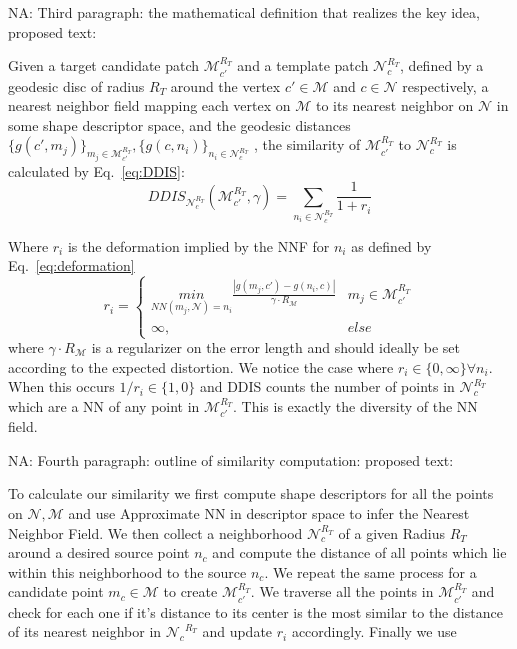 \documentclass[10pt,twocolumn,letterpaper]{article}
\newcommand{\colornote}[3]{{\color{#1}\bf{#2: #3}\normalfont}}
\newcommand{\colornote}[3]{}
\newcommand {\nadav}[1]{\colornote{red}{NA}{#1}}
\begin{document}
\nadav{Third paragraph: the mathematical definition that realizes the key idea, proposed text:

Given a target candidate patch ${\mathcal{M}^{R_T}_{c'}}$ and a template patch ${\mathcal{N}^{R_T}_{c}}$, defined by a geodesic disc of radius $R_T$ around  the vertex $c'\in\mathcal{M}$ and $c\in\mathcal{N}$ respectively, a nearest neighbor field mapping each vertex on $\mathcal{M}$ to its nearest neighbor on $\mathcal{N}$ in some shape descriptor space, and the geodesic distances $\{g(c',m_j)\}_{m_j\in\mathcal{M}^{R_T}_{c'}},\{g(c,n_i)\}_{n_i\in\mathcal{N}^{R_T}_{c}}$ , the similarity of ${\mathcal{M}^{R_T}_{c'}}$ to ${\mathcal{N}^{R_T}_{c}}$ is calculated by Eq.~\ref{eq:DDIS}:
\begin{equation}
DDIS_{\mathcal{N}^{R_T}_{c}}({\mathcal{M}^{R_T}_{c'}},\gamma)=\sum_{n_i\in {\mathcal{N}^{R_T}_{c}}}\frac{1}{1+r_i}
\label{eq:DDIS}
\end{equation}

Where $r_i$ is the deformation implied by the NNF for $n_i$ as defined by Eq.~\ref{eq:deformation}
\begin{equation}
r_i = 
\begin{cases}
\underset{NN(m_j,\mathcal{N})=n_i}{min}\frac{|g(m_j,c')-g(n_i,c)|}{\gamma\cdot R_\mathcal{M}} & m_j\in\mathcal{M}^{R_T}_{c'}\\
          \infty,&              else
\end{cases}
\label{eq:deformation}

\end{equation}
where $\gamma\cdot R_\mathcal{M}$ is a regularizer on the error length and should ideally be set according to the expected distortion. 
We notice the case where $r_i\in\{0,\infty\}\forall n_i$. When this occurs $1/r_i\in\{1,0\}$ and DDIS counts the number of points in ${\mathcal{N}^{R_T}_{c}}$ which are a NN of any point in ${\mathcal{M}^{R_T}_{c'}}$. This is exactly the diversity of the NN field.} 

\nadav{Fourth paragraph: outline of similarity computation: proposed text: 

To calculate our similarity we first compute shape descriptors for all the points on $\mathcal{N},\mathcal{M}$ and use Approximate NN in descriptor space to infer the Nearest Neighbor Field.
We then collect a neighborhood $\mathcal{N}^{R_T}_{c}$ of a given Radius $R_T$ around a desired source point $n_c$ and compute the distance of all points which lie within this neighborhood to the source $n_c$.
We repeat the same process for a candidate point $m_c\in\mathcal{M}$ to create ${\mathcal{M}^{R_T}_{c'}}$.
We traverse all the points in ${\mathcal{M}^{R_T}_{c'}}$ and check for each one if it's distance to its center is the most similar to the distance of its nearest neighbor in ${\mathcal{N}_c}^{R_T}$ and update $r_i$ accordingly. Finally we use 
}
\end{document}
